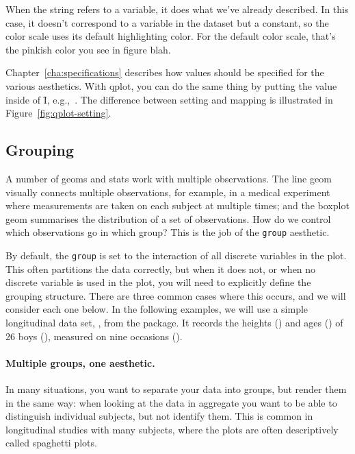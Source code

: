 When the string refers to a variable, it does what we've already described.  In this case, it doesn't correspond to a variable in the dataset but a constant, so the color scale uses its default highlighting color.  For the default color scale, that's the pinkish color you see in figure blah.

Chapter~\ref{cha:specifications} describes how values should be specified for the various aesthetics.  With qplot, you can do the same thing by putting the value inside of \f{I}, e.g.,\ .  The difference between setting and mapping is illustrated in Figure~\ref{fig:qplot-setting}.  

% 


\subsection{Grouping}
\label{sub:grouping}

A number of geoms and stats work with multiple observations.  The line geom visually connects multiple observations, for example, in a medical experiment where measurements are taken on each subject at multiple times; and the boxplot geom summarises the distribution of a set of observations.  How do we control which observations go in which group?  This is the job of the {\tt group} aesthetic.

By default, the {\tt group} is set to the interaction of all discrete variables in the plot.  This often partitions the data correctly, but when it does not, or when no discrete variable is used in the plot, you will need to explicitly define the grouping structure.  There are three common cases where this occurs, and we will consider each one below.  In the following examples, we will use a simple longitudinal data set, , from the  package.  It records the heights () and ages () of 26 boys (), measured on nine occasions (). 

\paragraph{Multiple groups, one aesthetic.} In many situations, you want to separate your data into groups, but render them in the same way: when looking at the data in aggregate you want to be able to distinguish individual subjects, but not identify them.  This is common in longitudinal studies with many subjects, where the plots are often descriptively called spaghetti plots.  

